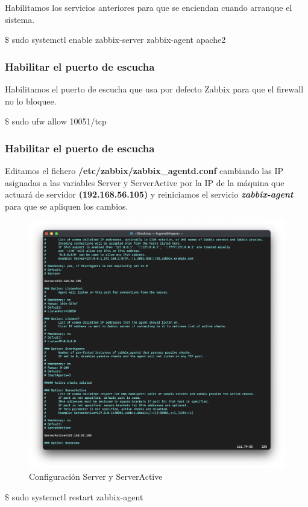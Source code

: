     Habilitamos los servicios anteriores para que se enciendan cuando arranque el sistema.
        \begin{tcolorbox}[colback=black!10, halign=left]
            \$ sudo systemctl enable zabbix-server zabbix-agent apache2
        \end{tcolorbox}

    \subsubsection{Habilitar el puerto de escucha}
    Habilitamos el puerto de escucha que usa por defecto Zabbix para que el firewall no lo bloquee.
        \begin{tcolorbox}[colback=black!10, halign=left]
            \$ sudo ufw allow 10051/tcp
        \end{tcolorbox}

    \subsubsection{Habilitar el puerto de escucha}
    Editamos el fichero \textbf{/etc/zabbix/zabbix\_agentd.conf} cambiando las IP asignadas a las variables Server y ServerActive por la IP de la máquina que actuará
    de servidor \textbf{(192.168.56.105)} y reiniciamos el servicio \textbf{\emph{zabbix-agent}} para que se apliquen los cambios.
        \begin{figure}[H]
            \centering
            \includegraphics[scale=0.45]{images/ubuntu_servers.png}
            \caption{Configuración Server y ServerActive}
            \label{fig:ubuntu_servers}
        \end{figure}
        \begin{tcolorbox}[colback=black!10, halign=left]
            \$ sudo systemctl restart zabbix-agent
        \end{tcolorbox}

